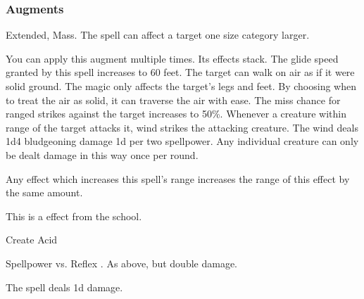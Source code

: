 \subsubsection{Augments}
 Extended, Mass.
The spell can affect a target one size category larger.
\par
You can apply this augment multiple times.
Its effects stack.
The glide speed granted by this spell increases to 60 feet.
The target can walk on air as if it were solid ground.
The magic only affects the target's legs and feet.
By choosing when to treat the air as solid, it can traverse the air with ease.
The miss chance for ranged strikes against the target increases to 50\%.
Whenever a creature within \rngclose range of the target attacks it, wind strikes the attacking creature.
The wind deals 1d4 bludgeoning damage \add 1d per two spellpower.
Any individual creature can only be dealt damage in this way once per round.
\par Any effect which increases this spell's range increases the range of this effect by the same amount.
\par
This is a  effect from the  school.
\begin{spellsection}{Create Acid}
\begin{spellheader}
\end{spellheader}
\begin{spellcontent}
\begin{spelltargetinginfo}
\end{spelltargetinginfo}
\begin{spelleffects}
\begin{spellattack}{Spellpower vs. Reflex}
\spellsuccess {}.
\spellcritical As above, but double damage.
\end{spellattack}
\end{spelleffects}
\end{spellcontent}
\begin{spellfooter}
\miscastexplode
\end{spellfooter}
\begin{spellcantrip}
The spell deals \minus1d damage.
\end{spellcantrip}
\end{spellsection}
